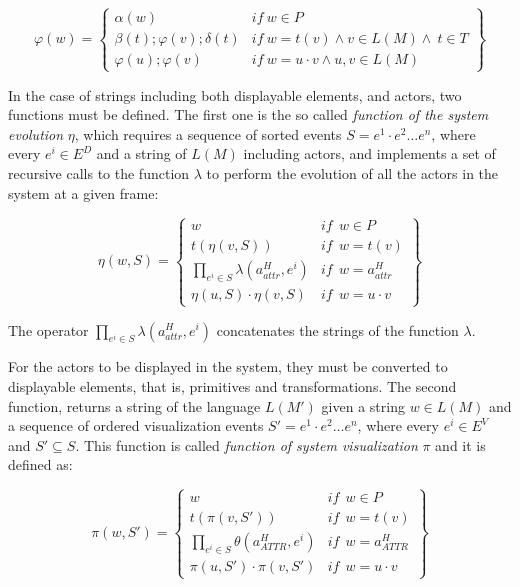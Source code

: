 \documentclass{svmult}
\begin{document}
\vspace{-0.4cm}
\[
    \varphi (w) = \left\{
    \begin{array}{ll}
        \alpha(w) & \mathit{if} \ w \in P  \\

        \beta(t); \varphi(v); \delta(t) & \mathit{if} \ w = t(v) \wedge v \in L(M) \wedge \ t \in T \\

        \varphi(u); \varphi(v)  & \mathit{if} \ w = u \cdotp v \wedge u, v \in L(M)
    \end{array}\right\}
\]

In the case of strings including both displayable elements, and actors, two functions must be defined. The first one is the so called \textit{function of the system evolution} $\eta$, which requires
a sequence of sorted events $S = e^1 \cdot e^2 \dots e^n$, where every $e^i \in E^D$ and a string of $L(M)$ including actors, and implements a set of recursive calls to the function $\lambda$ to perform the evolution of all the actors in the system at a given frame:

\vspace{-0.4cm}
\[
    \eta (w, S) = \left\{
    \begin{array}{ll}
        w   & \mathit{if}  \ \ w \in P \\

        t(\eta (v, S))    & \mathit{if}  \ \  w = t(v)  \\

        \prod_{e^{i} \in S} \lambda (a_{attr}^H, e^i)    & \mathit{if}  \ \ w = a_{attr}^H \\

        \eta (u, S) \cdot \eta (v, S)   & \mathit{if}  \ \  w = u \cdot v
    \end{array}\right\}
\]

The operator $\prod_{e^{i} \in S} \lambda (a_{attr}^H, e^i)$ concatenates the strings of the function $\lambda$. 

For the actors to be displayed in the system, they must be converted to displayable elements, that is, primitives and transformations. The second function, returns a string of the
language $L(M')$ given a string $w \in L(M)$ and a sequence of ordered visualization events $S' =
e^1 \cdot e^2 \dots e^n$, where every $e^i \in E^V$ and $S' \subseteq S$. This function is called
\textit{function of system visualization} $\pi$ and it is defined as:

\vspace{-0.4cm}
\[
    \pi (w, S') = \left\{
    \begin{array}{ll}
        w   & \mathit{if}  \ \ w \in P \\

        t(\pi (v, S'))    & \mathit{if}  \ \  w = t(v)  \\

        \prod_{e^{i} \in S} \theta (a_{ATTR}^H, e^i)    & \mathit{if}  \ \ w = a_{ATTR}^H \\

        \pi (u, S') \cdot \pi (v, S')   & \mathit{if}  \ \  w = u \cdot v
    \end{array}\right\}
\]
\end{document}
